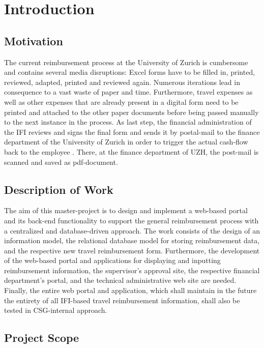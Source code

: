 \chapter{Introduction}

\section{Motivation}

The current reimbursement process at the University of Zurich is cumbersome and contains several media disruptions: Excel forms have to be filled in, printed, reviewed, adapted, printed and reviewed again. Numerous iterations lead in consequence to a vast waste of paper and time. Furthermore, travel expenses as well as other expenses that are already present in a digital form need to be printed and attached to the other paper documents before being passed manually to the next instance in the process. As last step, the financial administration of the IFI reviews and signs the final form and sends it by postal-mail to the finance department of the University of Zurich in order to trigger the actual cash-flow back to the employee \cite{ifi}. There, at the finance department of UZH, the post-mail is scanned and saved as pdf-document.

\section{Description of Work}

The aim of this master-project is to design and implement a web-based portal and its back-end functionality to support the general reimbursement process with a centralized and database-driven approach. The work consists of the design of an information model, the relational database model for storing reimbursement data, and the respective new travel reimbursement form. Furthermore, the development of the web-based portal and applications for displaying and inputting reimbursement information, the supervisor’s approval site, the respective financial department’s portal, and the technical administrative web site are needed. Finally, the entire web portal and application, which shall maintain in the future the entirety of all IFI-based travel reimbursement information, shall also be tested in CSG-internal approach.


\section{Project Scope}

